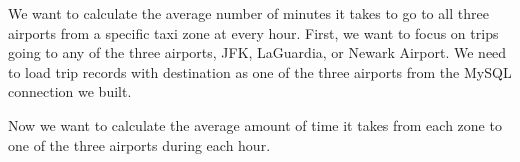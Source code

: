 \documentclass[12pt,twoside]{reedthesis}
\newenvironment{Shaded}{\begin{snugshade}}{\end{snugshade}}
\newcommand{\KeywordTok}[1]{\textcolor[rgb]{0.13,0.29,0.53}{\textbf{#1}}}
\newcommand{\DecValTok}[1]{\textcolor[rgb]{0.00,0.00,0.81}{#1}}
\newcommand{\StringTok}[1]{\textcolor[rgb]{0.31,0.60,0.02}{#1}}
\newcommand{\CommentTok}[1]{\textcolor[rgb]{0.56,0.35,0.01}{\textit{#1}}}
\newcommand{\OperatorTok}[1]{\textcolor[rgb]{0.81,0.36,0.00}{\textbf{#1}}}
\newcommand{\NormalTok}[1]{#1}
\theoremstyle{definition}
\theoremstyle{definition}
\theoremstyle{definition}
\theoremstyle{remark}
\begin{document}
We want to calculate the average number of minutes it takes to go to all
three airports from a specific taxi zone at every hour. First, we want
to focus on trips going to any of the three airports, JFK, LaGuardia, or
Newark Airport. We need to load trip records with destination as one of
the three airports from the MySQL connection we built.
\begin{Shaded}
\end{Shaded}
Now we want to calculate the average amount of time it takes from each
zone to one of the three airports during each hour.
\end{document}
